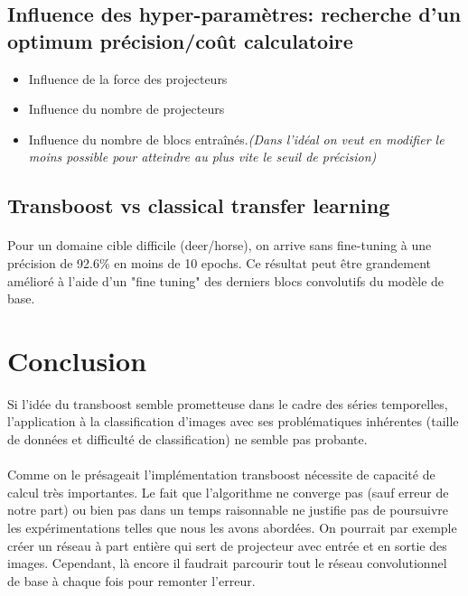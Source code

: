 \documentclass[11 pt]{article}
\begin{document}
\subsection{Influence des hyper-paramètres: recherche d'un optimum précision/coût calculatoire}
\begin{itemize}
\item Influence de la force des projecteurs
\item Influence du nombre de projecteurs
\item Influence du nombre de blocs entraînés.\emph{(Dans l’idéal on veut en modifier le moins possible pour atteindre au plus vite le seuil de précision)}
\end{itemize}

\subsection{Transboost vs classical transfer learning}
\paragraph{}Pour un domaine cible difficile (deer/horse), on arrive sans fine-tuning à une précision de 92.6\% en moins de 10 epochs. Ce résultat peut être grandement amélioré à l'aide d'un "fine tuning" des derniers blocs convolutifs du modèle de base.

\section{Conclusion}
Si l'idée du transboost semble prometteuse dans le cadre des séries temporelles, l'application à la classification d'images avec ses problématiques inhérentes (taille de données et difficulté de classification) ne semble pas probante.

\paragraph{} Comme on le présageait l'implémentation transboost nécessite de capacité de calcul très importantes. Le fait que l'algorithme ne converge pas (sauf erreur de notre part) ou bien pas dans un temps raisonnable ne justifie pas de poursuivre les expérimentations telles que nous les avons abordées. On pourrait par exemple créer un réseau à part entière qui sert de projecteur avec entrée et en sortie des images. Cependant, là encore il faudrait parcourir tout le réseau convolutionnel de base à chaque fois pour remonter l'erreur.
\end{document}
